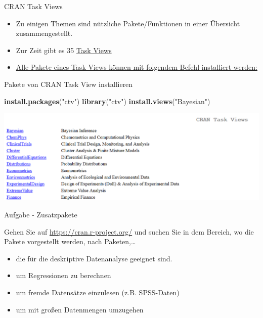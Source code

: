 \documentclass[ignorenonframetext,]{beamer}
\newenvironment{Shaded}{}{}
\newcommand{\KeywordTok}[1]{\textcolor[rgb]{0.00,0.44,0.13}{\textbf{{#1}}}}
\newcommand{\StringTok}[1]{\textcolor[rgb]{0.25,0.44,0.63}{{#1}}}
\newcommand{\NormalTok}[1]{{#1}}
\providecommand{\tightlist}{%
\setlength{\itemsep}{0pt}\setlength{\parskip}{0pt}}
\begin{document}
\begin{frame}[fragile]{CRAN Task Views}

\begin{itemize}
\item
  Zu einigen Themen sind nützliche Pakete/Funktionen in einer Übersicht
  zusammengestellt.
\item
  Zur Zeit gibt es 35 \href{https://cran.r-project.org/web/views/}{Task
  Views}
\item
  \href{https://mran.microsoft.com/rpackages/}{Alle Pakete eines Task
  Views können mit folgendem Befehl installiert werden:}
\end{itemize}

\begin{block}{Pakete von CRAN Task View installieren}

\begin{Shaded}
\begin{Highlighting}[]
\KeywordTok{install.packages}\NormalTok{(}\StringTok{"ctv"}\NormalTok{)}
\KeywordTok{library}\NormalTok{(}\StringTok{"ctv"}\NormalTok{)}
\KeywordTok{install.views}\NormalTok{(}\StringTok{"Bayesian"}\NormalTok{)}
\end{Highlighting}
\end{Shaded}

\includegraphics{./tex2pdf.956/add042645f04b28284c1b44301a5173fdf315965.png}

\end{block}

\end{frame}

\begin{frame}{Aufgabe - Zusatzpakete}

Gehen Sie auf \url{https://cran.r-project.org/} und suchen Sie in dem
Bereich, wo die Pakete vorgestellt werden, nach Paketen,\ldots{}

\begin{itemize}
\tightlist
\item
  die für die deskriptive Datenanalyse geeignet sind.
\item
  um Regressionen zu berechnen
\item
  um fremde Datensätze einzulesen (z.B. SPSS-Daten)
\item
  um mit großen Datenmengen umzugehen
\end{itemize}

\end{frame}
\end{document}
